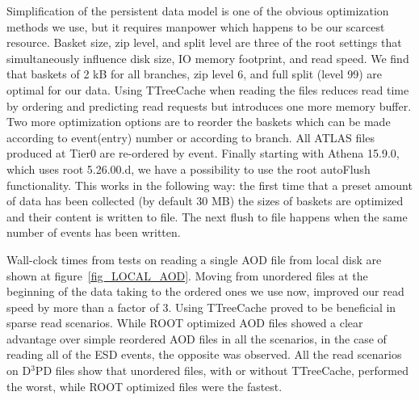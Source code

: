 \documentclass[a4paper]{jpconf}
\begin{document}
Simplification of the persistent data model is one of the obvious optimization methods we use, but it requires manpower which happens to be our scarcest resource. Basket size, zip level, and split level are three of the root settings that simultaneously influence disk size, IO memory footprint, and read speed. We find that baskets of 2 kB for all branches, zip level 6, and full split (level 99) are optimal for our data.
Using TTreeCache when reading the files reduces read time by ordering and predicting read requests but introduces one more memory buffer. 
Two more optimization options are to reorder the baskets which can be made according to event(entry) number or according to branch.
All ATLAS files produced at Tier0 are re-ordered by event.
Finally starting with Athena 15.9.0, which uses root 5.26.00.d, we have a possibility to use the root autoFlush functionality. This works in the following way: the first time that a preset amount of data has been collected (by default 30 MB) the sizes of baskets are optimized and their content is written to file. The next flush to file happens when the same number of events has been written.

Wall-clock times from tests on reading a single AOD file from local disk are shown at figure~\ref{fig_LOCAL_AOD}. Moving from unordered files at the beginning of the data taking to the ordered ones we use now, improved our read speed by more than a factor of 3. Using TTreeCache proved to be beneficial in sparse read scenarios. While ROOT optimized AOD files showed a clear advantage over simple reordered AOD files in all the scenarios, in the case of reading all of the ESD events, the opposite was observed. All the read scenarios on D$^3$PD files show that unordered files, with or without TTreeCache, performed the worst, while ROOT optimized files were the fastest. 
\end{document}
